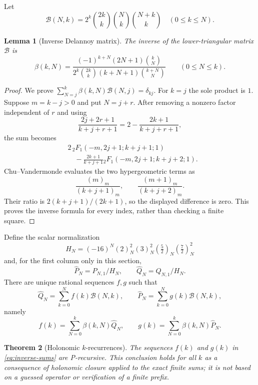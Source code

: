 \documentclass[11pt]{article}
\newtheorem{theorem}{Theorem}
\newtheorem{lemma}[theorem]{Lemma}
\theoremstyle{remark}
\begin{document}
Let
\[
 \mathcal B(N,k)=2^k\binom{2k}{k}\binom Nk\binom{N+k}{k}
 \quad(0\leq k\leq N).
\]

\begin{lemma}[Inverse Delannoy matrix]\label{lem:inverse-delannoy}
The inverse of the lower-triangular matrix $\mathcal B$ is
\begin{equation}\label{eq:inverse-delannoy}
 \beta(k,N)=
 \frac{(-1)^{k+N}(2N+1)\binom{k}{N}}
 {2^k\binom{2k}{k}(k+N+1)\binom{k+N}{N}}
 \qquad(0\leq N\leq k).
\end{equation}
\end{lemma}

\begin{proof}
We prove
$\sum_{N=j}^k\beta(k,N)\mathcal B(N,j)=\delta_{kj}$.
For $k=j$ the sole product is $1$.  Suppose $m=k-j>0$ and put
$N=j+r$.  After removing a nonzero factor independent of $r$ and
using
\[
 \frac{2j+2r+1}{k+j+r+1}
 =2-\frac{2k+1}{k+j+r+1},
\]
the sum becomes
\begin{align*}
&2\,{}_2F_1(-m,2j+1;k+j+1;1)\\
&\quad-\frac{2k+1}{k+j+1}
 {}_2F_1(-m,2j+1;k+j+2;1).
\end{align*}
Chu--Vandermonde evaluates the two hypergeometric terms as
\[
 \frac{(m)_m}{(k+j+1)_m},\qquad
 \frac{(m+1)_m}{(k+j+2)_m}.
\]
Their ratio is $2(k+j+1)/(2k+1)$, so the displayed difference is
zero.  This proves the inverse formula for every index, rather than
checking a finite square.
\end{proof}

Define the scalar normalization
\[
 H_N=(-16)^N(2)_N^2(3)_N^2(\tfrac52)_N(\tfrac72)_N^2
\]
and, for the first column only in this section,
\[
 \widehat P_N=P_{N,1}/H_N,\qquad
 \widehat Q_N=Q_{N,1}/H_N.
\]
There are unique rational sequences $f,g$ such that
\begin{equation}\label{eq:delannoy-expansion}
 \widehat Q_N=\sum_{k=0}^Nf(k)\mathcal B(N,k),\qquad
 \widehat P_N=\sum_{k=0}^Ng(k)\mathcal B(N,k),
\end{equation}
namely
\begin{equation}\label{eq:inverse-sums}
 f(k)=\sum_{N=0}^k\beta(k,N)\widehat Q_N,\qquad
 g(k)=\sum_{N=0}^k\beta(k,N)\widehat P_N.
\end{equation}

\begin{theorem}[Holonomic $k$-recurrences]\label{thm:k-closure}
The sequences $f(k)$ and $g(k)$ in \eqref{eq:inverse-sums} are
P-recursive.  This conclusion holds for all $k$ as a consequence of
holonomic closure applied to the exact finite sums; it is not based
on a guessed operator or verification of a finite prefix.
\end{theorem}
\end{document}
